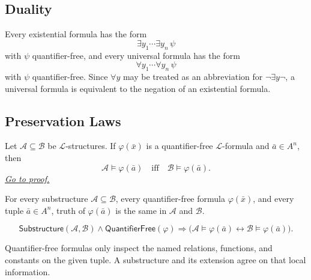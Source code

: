 \subsection{Duality}

\begin{remark*}[Duality]
Every existential formula has the form
\[
  \exists y_1\cdots\exists y_n\,\psi
\]
with $\psi$ quantifier-free, and every universal formula has the form
\[
  \forall y_1\cdots\forall y_n\,\psi
\]
with $\psi$ quantifier-free. Since $\forall y$ may be treated as an
abbreviation for $\lnot\exists y\lnot$, a universal formula is equivalent to
the negation of an existential formula.
\end{remark*}

\subsection{Preservation Laws}

\begin{lemma}\label{lem:quantifier-free-formulas-preserved-by-substructures}
Let $\mathcal{A}\subseteq\mathcal{B}$ be $\mathcal{L}$-structures. If
$\varphi(\bar x)$ is a quantifier-free $\mathcal{L}$-formula and
$\bar a\in A^n$, then
\[
  \mathcal{A}\models\varphi(\bar a)
  \quad\text{iff}\quad
  \mathcal{B}\models\varphi(\bar a).
\]
\hyperref[prf:quantifier-free-formulas-preserved-by-substructures]{\textit{Go to proof.}}
\end{lemma}

\begin{remark*}
For every substructure $\mathcal{A}\subseteq\mathcal{B}$, every
quantifier-free formula $\varphi(\bar x)$, and every tuple $\bar a\in A^n$,
truth of $\varphi(\bar a)$ is the same in $\mathcal{A}$ and $\mathcal{B}$.
\end{remark*}

\begin{remark*}
\[
\mathsf{Substructure}(\mathcal{A},\mathcal{B})
\land
\mathsf{QuantifierFree}(\varphi)
\Longrightarrow
\bigl(\mathcal{A}\models\varphi(\bar a)
\leftrightarrow
\mathcal{B}\models\varphi(\bar a)\bigr).
\]
\end{remark*}

\begin{remark*}[Interpretation]
Quantifier-free formulas only inspect the named relations, functions, and
constants on the given tuple. A substructure and its extension agree on that
local information.
\end{remark*}

